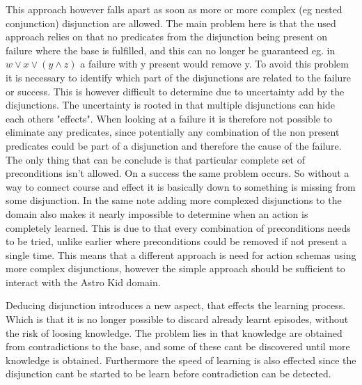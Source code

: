	This approach however falls apart as soon as more or more complex (eg nested conjunction) disjunction are allowed. The main problem here is that the used approach relies on that no predicates from the disjunction being present on failure where the base is fulfilled, and this can no longer be guaranteed eg. in $w \lor x \lor (y \land z )$ a failure with y present would remove y. To avoid this problem it is necessary to identify which part of the disjunctions are related to the failure or success. This is however difficult to determine due to uncertainty add by the disjunctions. The uncertainty is rooted in that multiple disjunctions can hide each others "effects". When looking at a failure it is therefore not possible to eliminate any predicates, since potentially any combination of the non present predicates could be part of a disjunction and therefore the cause of the failure. The only thing that can be conclude is that particular complete set of preconditions isn't allowed. On a success the same problem occurs. So without a way to connect course and effect it is basically down to something is missing from some disjunction. In the same note adding more complexed disjunctions to the domain also makes it nearly impossible to determine when an action is completely learned. This is due to that every combination of preconditions needs to be tried, unlike earlier where preconditions could be removed if not present a single time. This means that a different approach is need for action schemas using more complex disjunctions, however the simple approach should be sufficient to interact with the Astro Kid domain.
	 
	

%	
	


	Deducing disjunction introduces a new aspect, that effects the learning process.  Which is that it is no longer possible to discard already learnt episodes,  without the risk of loosing knowledge. The problem lies in that knowledge are obtained from contradictions to the base, and some of these cant be discovered until more knowledge is obtained. Furthermore the speed of learning is also effected since the disjunction cant be started to be learn before contradiction can be detected. 
	
	
